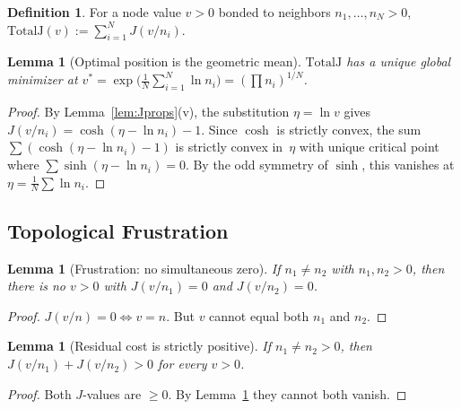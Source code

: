 \documentclass[12pt, reqno]{amsart}
\newtheorem{lemma}[theorem]{Lemma}
\theoremstyle{definition}
\newtheorem{definition}[theorem]{Definition}
\theoremstyle{remark}
\numberwithin{equation}{section}
\newcommand{\Jc}{J}
\begin{document}
\begin{definition}\label{def:totalJcost}
For a node value $v>0$ bonded to neighbors $n_1,\dots,n_N>0$,
$\mathrm{TotalJ}(v):=\sum_{i=1}^N \Jc(v/n_i)$.
\end{definition}

\begin{lemma}[Optimal position is the geometric mean]\label{lem:geom-mean}
$\mathrm{TotalJ}$ has a unique global minimizer at
$v^*=\exp\bigl(\tfrac1N\sum_{i=1}^N\ln n_i\bigr)=(\prod n_i)^{1/N}$.
\end{lemma}
\begin{proof}
By Lemma~\ref{lem:Jprops}(v), the substitution $\eta=\ln v$ gives
$\Jc(v/n_i)=\cosh(\eta-\ln n_i)-1$.  Since $\cosh$ is strictly convex,
the sum $\sum(\cosh(\eta-\ln n_i)-1)$ is strictly convex in~$\eta$
with unique critical point where
$\sum\sinh(\eta-\ln n_i)=0$.  By the odd symmetry of $\sinh$,
this vanishes at $\eta=\tfrac1N\sum\ln n_i$.
\end{proof}

\subsection{Topological Frustration}

\begin{lemma}[Frustration: no simultaneous zero]\label{lem:no-simult}
If $n_1\neq n_2$ with $n_1,n_2>0$, then there is no $v>0$ with
$\Jc(v/n_1)=0$ and $\Jc(v/n_2)=0$.
\end{lemma}
\begin{proof}
$\Jc(v/n)=0 \Leftrightarrow v=n$.  But $v$ cannot equal both $n_1$ and $n_2$.
\end{proof}

\begin{lemma}[Residual cost is strictly positive]\label{lem:residual}
If $n_1\neq n_2>0$, then $\Jc(v/n_1)+\Jc(v/n_2)>0$ for every $v>0$.
\end{lemma}
\begin{proof}
Both $\Jc$-values are $\ge 0$.  By Lemma~\ref{lem:no-simult} they cannot
both vanish.
\end{proof}
\end{document}
